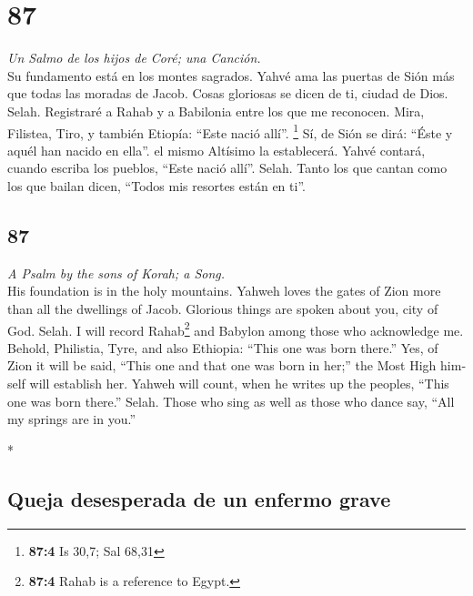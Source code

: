 \begin{paracol}{2}
\hypertarget{section-172}{%
\section{87}\label{section-172}}

\emph{Un Salmo de los hijos de Coré; una Canción.}\\
 Su fundamento está en los montes sagrados. 
Yahvé ama las puertas de Sión más que todas las moradas de Jacob.
 Cosas gloriosas se dicen de ti, ciudad de Dios. Selah.
 Registraré a Rahab y a Babilonia entre los que me
reconocen. Mira, Filistea, Tiro, y también Etiopía: ``Este nació allí''.
\footnote{\textbf{87:4} Is 30,7; Sal 68,31}  Sí, de Sión
se dirá: ``Éste y aquél han nacido en ella''. el mismo Altísimo la
establecerá.  Yahvé contará, cuando escriba los pueblos,
``Este nació allí''. Selah.  Tanto los que cantan como los
que bailan dicen, ``Todos mis resortes están en ti''.

\switchcolumn
\begin{otherlanguage}{english}

\hypertarget{section-173}{%
\section{87}\label{section-173}}

\emph{A Psalm by the sons of Korah; a Song.}\\
 His foundation is in the holy mountains. 
Yahweh loves the gates of Zion more than all the dwellings of Jacob.
 Glorious things are spoken about you, city of God. Selah.
 I will record Rahab\footnote{\textbf{87:4} Rahab is a
  reference to Egypt.} and Babylon among those who acknowledge me.
Behold, Philistia, Tyre, and also Ethiopia: ``This one was born there.''
 Yes, of Zion it will be said, ``This one and that one was
born in her;'' the Most High himself will establish her. 
Yahweh will count, when he writes up the peoples, ``This one was born
there.'' Selah.  Those who sing as well as those who dance
say, ``All my springs are in you.''

\end{otherlanguage}

\switchcolumn[0]*

\hypertarget{queja-desesperada-de-un-enfermo-grave}{%
\subsection{Queja desesperada de un enfermo
grave}\label{queja-desesperada-de-un-enfermo-grave}}


\end{paracol}
